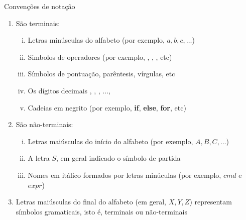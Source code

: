 \begin{frame}[fragile]{Convenções de notação}

    \begin{enumerate}
        \item São terminais:
            \begin{enumerate}[(i)]
                \item Letras minúsculas do alfabeto (por exemplo, $a, b, c, \ldots$)
                \item Simbolos de operadores (por exemplo, , , , etc)
                \item Símbolos de pontuação, parêntesis, vírgulas, etc
                \item Os dígitos decimais , , , ..., 
                \item Cadeias em negrito (por exemplo, \textbf{if}, \textbf{else}, \textbf{for}, etc)
            \end{enumerate}

        \item São não-terminais:
            \begin{enumerate}[(i)]
                \item Letras maiúsculas do início do alfabeto (por exemplo, $A, B, C, \ldots$)
                \item A letra $S$, em geral indicado o símbolo de partida
                \item Nomes em itálico formados por letras minúculas (por exemplo, $cmd$ e $expr$)
            \end{enumerate}

        \item Letras maiúsculas do final do alfabeto (em geral, $X, Y, Z$) representam símbolos gramaticais, isto é, terminais ou não-terminais
    \end{enumerate}

\end{frame}


